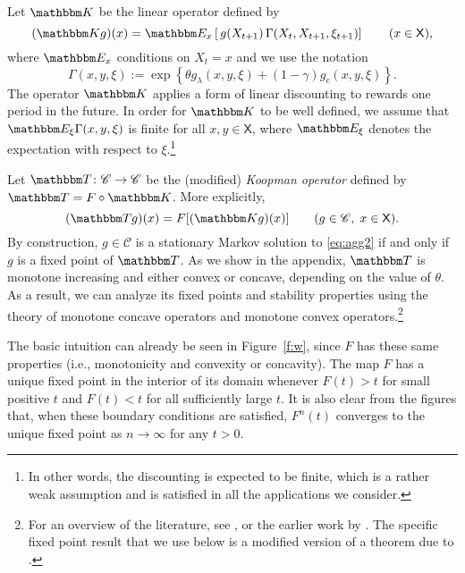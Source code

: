 \documentclass[12pt, reqno]{amsart}
\newcommand{\1}{\mathbbm 1}
\newcommand{\cC}{\mathscr C}
\newcommand{\KK}{\mathbbm K}
\newcommand{\EE}{\mathbbm E}
\newcommand{\TT}{\mathbbm T}
\newcommand{\XX}{\mathsf X}
\theoremstyle{plain}
\theoremstyle{definition}
\begin{document}
Let $\KK$ be the linear operator defined by
%
\begin{equation}\label{eq:defk}
    (\KK g)(x) = \EE_x \left[
        \, g(X_{t+1})  \, \Gamma(X_t, X_{t+1}, \xi_{t+1})
    \right]
    \qquad (x \in \XX),
\end{equation}
%
where $\EE_x$ conditions on $X_t = x$ and we use the notation
%
\begin{equation}\label{eq:sdef}
    \Gamma(x, y, \xi) 
    :=  \exp
    \left\{ 
        \theta g_\lambda(x, y, \xi) + (1-\gamma) g_c(x, y, \xi)
    \right\}.
\end{equation}
%
The operator $\KK$ applies a form of linear discounting to rewards one period
in the future. In order for $\KK$ to be well defined, we assume that $\EE_\xi
\Gamma(x, y, \xi)$ is finite for all $x, y \in \XX$, where $\EE_\xi$ denotes
the expectation with respect to $\xi$.\footnote{In other words, the
  discounting is expected to be finite, which is a rather weak assumption and
  is satisfied in all the applications we consider.}

Let $\TT
\colon \cC \to \cC$ be the (modified) \emph{Koopman operator} defined by $\TT =
F \circ \KK$.  More explicitly,
%
\begin{equation}\label{eq:deft}
    (\TT g)(x) = F [ (\KK g)(x)]
    \qquad (g \in \cC, \; x \in \XX).
\end{equation}
%
By construction, $g \in \cC$ is a stationary Markov solution to
\eqref{eq:agg2} if and only if $g$ is a fixed point of $\TT$.
As we show in the appendix, $\TT$ is monotone increasing and either
convex or concave, depending on the value of $\theta$.  As a result, we can
analyze its fixed points and stability properties using the theory of monotone
concave operators and monotone convex operators.\footnote{For an overview of
    the literature, see \cite{zhang2013}, or the earlier work by
    \cite{krasnoselskii1964}.  The specific fixed point result that we use
    below is a modified version of a theorem due to \cite{du1990fixed}.}

The basic intuition can already be seen in Figure~\ref{f:w}, since $F$ has
these same properties (i.e., monotonicity and convexity or concavity).  The
map $F$ has a unique fixed point in the interior of its domain whenever $F(t)
> t$ for small positive $t$ and $F(t) < t$ for all sufficiently large $t$.  It
is also clear from the figures that, when these boundary conditions are
satisfied,  $F^n(t)$ converges to the unique fixed point as $n \to \infty$ for
any $t > 0$.
\end{document}
